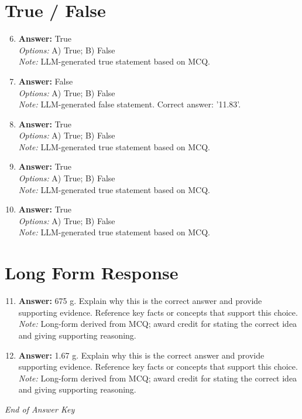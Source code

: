 \documentclass[12pt]{article}
\begin{document}
\section*{True / False}
\begin{enumerate}[label=\arabic*.]
\setcounter{enumi}{5}
\item \textbf{Answer:} True
\\ \textit{Options:} A) True; B) False
\\ \textit{Note:} LLM-generated true statement based on MCQ.
\item \textbf{Answer:} False
\\ \textit{Options:} A) True; B) False
\\ \textit{Note:} LLM-generated false statement. Correct answer: '11.83'.
\item \textbf{Answer:} True
\\ \textit{Options:} A) True; B) False
\\ \textit{Note:} LLM-generated true statement based on MCQ.
\item \textbf{Answer:} True
\\ \textit{Options:} A) True; B) False
\\ \textit{Note:} LLM-generated true statement based on MCQ.
\item \textbf{Answer:} True
\\ \textit{Options:} A) True; B) False
\\ \textit{Note:} LLM-generated true statement based on MCQ.
\end{enumerate}

\section*{Long Form Response}
\begin{enumerate}[label=\arabic*.]
\setcounter{enumi}{10}
\item \textbf{Answer:} 675 g. Explain why this is the correct answer and provide supporting evidence. Reference key facts or concepts that support this choice.
\\ \textit{Note:} Long-form derived from MCQ; award credit for stating the correct idea and giving supporting reasoning.
\item \textbf{Answer:} 1.67 g. Explain why this is the correct answer and provide supporting evidence. Reference key facts or concepts that support this choice.
\\ \textit{Note:} Long-form derived from MCQ; award credit for stating the correct idea and giving supporting reasoning.
\end{enumerate}

\vfill
\noindent\textit{End of Answer Key}
\end{document}
